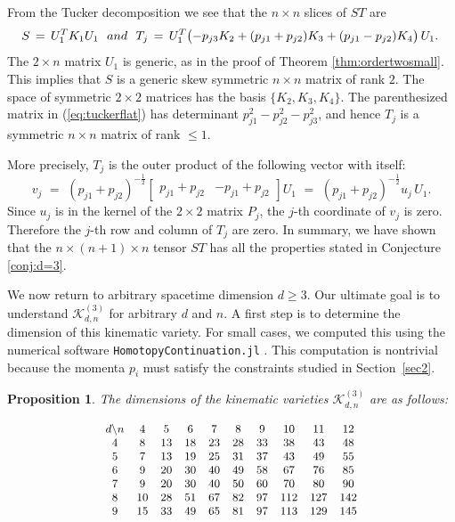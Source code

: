 \documentclass[english]{ourlematema}
\numberwithin{theorem}{section}
\newtheorem{proposition}[theorem]{Proposition}
\theoremstyle{definition}
\begin{document}
    From the Tucker decomposition we see that the $n \times n$ slices of $ST$ are 
    \begin{equation}
\label{eq:tuckerflat}
\!        S \,=\, U_1^T K_1 U_1\, \,\,\, {\rm and}\,\,\,\,
     T_j \,=\, U_1^T\bigl(-p_{j3}K_2 + (p_{j1} + p_{j2})K_3 + (p_{j1} - p_{j2})K_4\bigr)\, U_1.
\end{equation}
    The $2 \times n$ matrix $U_1$ is generic, as in the
    proof of Theorem \ref{thm:ordertwosmall}. This implies
        that $S$ is a generic skew symmetric $n \times n$ matrix of rank $2$.
    The space of symmetric $2 \times 2$ matrices has the basis $\{K_2,K_3,K_4\}$.
    The parenthesized matrix in (\ref{eq:tuckerflat}) has
    determinant $p_{j1}^2 - p_{j2}^2 - p_{j3}^2$,
    and hence $T_j$ is a symmetric 
    $n \times n$ matrix of rank $\leq 1$. 
    
    More precisely, $T_j$ is the outer product of the
    following vector with itself:
    $$
    v_j \,\,=\,\, (p_{j1} + p_{j2})^{-\frac{1}{2}} \begin{bmatrix}
        p_{j1} + p_{j2} & -p_{j1} + p_{j2}
    \end{bmatrix}U_1\,\, =\,\, (p_{j1} + p_{j2})^{-\frac{1}{2}}  u_j \,U_1.
    $$
        Since $u_j$ is in the kernel of 
        the $2 \times 2 $ matrix $P_j$, the $j$-th coordinate of $v_j$ is zero.
        Therefore the $j$-th row and column of $T_j$ are zero.
    In summary, we have shown that the 
    $n \times (n+1) \times n$ tensor $ST$ has all the properties 
    stated in Conjecture \ref{conj:d=3}.


    We now return to arbitrary spacetime dimension $d \geq 3$.
Our ultimate goal is to understand 
 $\mathcal{K}^{(3)}_{d,n}$ for arbitrary $d$ and $n$.
 A first step is to determine the dimension of this kinematic variety.
For  small cases, we computed this
using the numerical software
{\tt HomotopyContinuation.jl} \cite{julia}.
This computation is nontrivial because the
momenta $p_i$ must satisfy the constraints studied in
Section~\ref{sec2}.

\begin{proposition} \label{prop:dimensions}
The dimensions of the kinematic varieties $\mathcal{K}^{(3)}_{d,n}$ are as follows:

$$ \begin{small}
\begin{matrix}
    d \backslash n  & 4 & 5 & 6 & 7 & 8 & 9 & 10 & 11 & 12\\
    4 &  8 & 13 & 18 & 23 & 28 & 33 & 38 & 43 & 48\\
    5 &  7 & 13 & 19 & 25 & 31 & 37 & 43 & 49 & 55\\
    6 &  9 & 20 & 30 & 40 & 49 & 58 & 67 & 76 & 85\\
    7 &  9 & 20 & 30 & 40 & 50 & 60 & 70 & 80 & 90\\
    8 &  10 & 28 & 51 & 67 & 82 & 97 & 112 & 127 & 142\\
    9 &  15 & 33 & 49 & 65 & 81 & 97 & 113 & 129 & 145 \\
\end{matrix} \end{small}
$$
\end{proposition}
\end{document}
